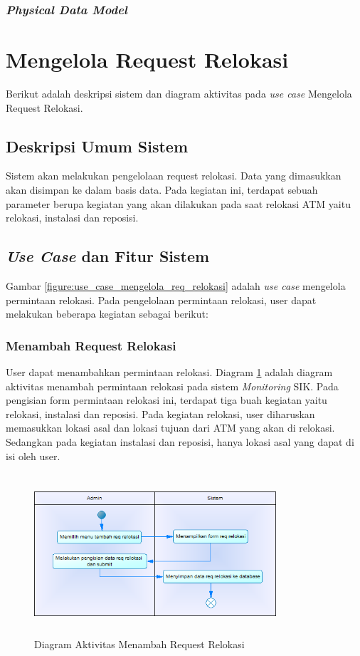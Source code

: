 \subsubsection{\textit{Physical Data Model}}


\section{Mengelola Request Relokasi}
Berikut adalah deskripsi sistem dan diagram aktivitas pada \textit{use case} Mengelola Request Relokasi. 
\subsection{Deskripsi Umum Sistem}
\tab Sistem akan melakukan pengelolaan request relokasi. Data yang dimasukkan akan disimpan ke dalam basis data. Pada kegiatan ini, terdapat sebuah parameter berupa kegiatan yang akan dilakukan pada saat relokasi ATM yaitu relokasi, instalasi dan reposisi.
\subsection{\textit{Use Case} dan Fitur Sistem}
Gambar \ref{figure:use_case_mengelola_req_relokasi} adalah \textit{use case} mengelola permintaan relokasi. Pada pengelolaan permintaan relokasi, user dapat melakukan beberapa kegiatan sebagai berikut:
	\subsubsection{Menambah Request Relokasi}
	User dapat menambahkan permintaan relokasi. Diagram \ref{figure:activity_menambah_req_relokasi} adalah diagram aktivitas menambah permintaan relokasi pada sistem \textit{Monitoring} SIK. Pada pengisian form permintaan relokasi ini, terdapat tiga buah kegiatan yaitu relokasi, instalasi dan reposisi. Pada kegiatan relokasi, user diharuskan memasukkan lokasi asal dan lokasi tujuan dari ATM yang akan di relokasi. Sedangkan pada kegiatan instalasi dan reposisi, hanya lokasi asal yang dapat di isi oleh user.
	\begin{figure}[h]
	\centerline {\includegraphics[width=9cm,height=6cm]{bab4/ActivityDiagram_MenambahkanReqRelokasi.png}}
	\caption{Diagram Aktivitas Menambah Request Relokasi}
	\label{figure:activity_menambah_req_relokasi}
	\end{figure}
		
